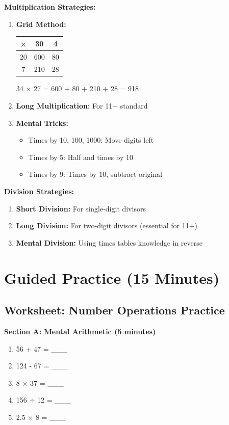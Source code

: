 \documentclass{article}
\begin{document}
\textbf{Multiplication Strategies:}
\begin{enumerate}
    \item \textbf{Grid Method:} 
    \begin{center}
    \begin{tabular}{|c|c|c|}
    \hline
    × & 30 & 4 \\
    \hline
    20 & 600 & 80 \\
    \hline
    7 & 210 & 28 \\
    \hline
    \end{tabular}
    \end{center}
    34 × 27 = 600 + 80 + 210 + 28 = 918
    
    \item \textbf{Long Multiplication:} For 11+ standard
    
    \item \textbf{Mental Tricks:}
    \begin{itemize}
        \item Times by 10, 100, 1000: Move digits left
        \item Times by 5: Half and times by 10
        \item Times by 9: Times by 10, subtract original
    \end{itemize}
\end{enumerate}

\textbf{Division Strategies:}
\begin{enumerate}
    \item \textbf{Short Division:} For single-digit divisors
    \item \textbf{Long Division:} For two-digit divisors (essential for 11+)
    \item \textbf{Mental Division:} Using times tables knowledge in reverse
\end{enumerate}

\section{Guided Practice (15 Minutes)}

\subsection*{Worksheet: Number Operations Practice}

\textbf{Section A: Mental Arithmetic (5 minutes)}
\begin{enumerate}
    \item 56 + 47 = \_\_\_
    \item 124 - 67 = \_\_\_
    \item 8 × 37 = \_\_\_
    \item 156 ÷ 12 = \_\_\_
    \item 2.5 × 8 = \_\_\_
\end{enumerate}
\end{document}
